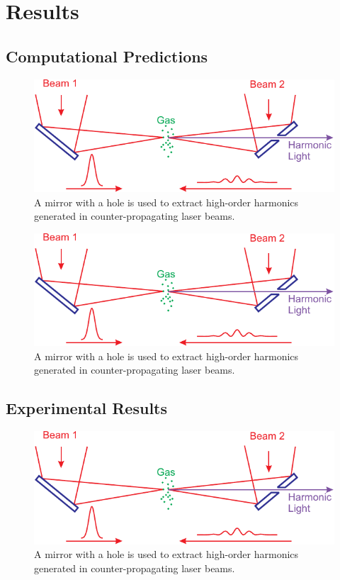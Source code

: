 \documentclass[oneside, astronomy, noacknowlegments]{BYUPhys}
\begin{document}
\chapter{Results}
\section{Computational Predictions}

\begin{figure}
    \centerline{\includegraphics{Graphic1}}
    \caption[ODMR computational model for SiC]{\label{fig:SiCModel}
     A mirror with a hole is used to extract high-order harmonics generated in
     counter-propagating laser beams.}
 \end{figure}

\begin{figure}
    \centerline{\includegraphics{Graphic1}}
    \caption[ODMR computational model for CdTe]{\label{fig:CdTeModel}
     A mirror with a hole is used to extract high-order harmonics generated in
     counter-propagating laser beams.}
 \end{figure}

\section{Experimental Results}

\begin{figure}
    \centerline{\includegraphics{Graphic1}}
    \caption[Experimental ODMR for SiC]{\label{fig:SiCResults}
     A mirror with a hole is used to extract high-order harmonics generated in
     counter-propagating laser beams.}
 \end{figure}
\end{document}
